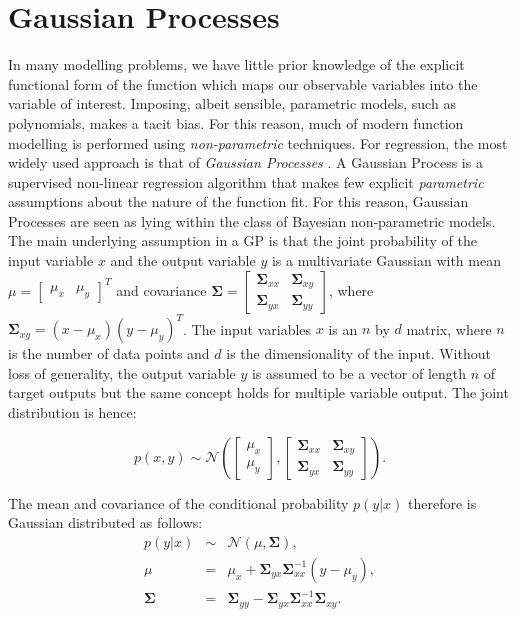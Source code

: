 \documentclass[useAMS,usenatbib,fleqn]{mn2e}
\begin{document}
\section{Gaussian Processes}
\label{sec-gaussian-process}
In many modelling problems, we have little prior knowledge of the explicit functional form of the function which maps our observable variables into the variable of interest. Imposing, albeit sensible, parametric models, such as polynomials, makes a tacit bias. For this reason, much of modern function modelling is performed using \emph{non-parametric} techniques. For regression, the most widely used approach is that of \emph{Gaussian Processes} \citep{rasmussen2006gaussian}.
A Gaussian Process is a supervised non-linear regression algorithm that makes few explicit \emph{parametric} assumptions about the nature of the function fit. For this reason, Gaussian Processes are seen as lying within the class of Bayesian non-parametric models. The main underlying assumption in a GP is that the joint probability of the input variable $x$ and the output variable $y$ is a multivariate Gaussian with mean $\mu=\begin{bmatrix} \mu_{x} & \mu_{y}\end{bmatrix}^{T}$ and covariance $\mathbf\Sigma=\begin{bmatrix}\mathbf\Sigma_{xx} & \mathbf\Sigma_{xy} \\ \mathbf\Sigma_{yx} & \mathbf\Sigma_{yy} \end{bmatrix}$, where $\mathbf\Sigma_{xy}=(x-\mu_{x})(y-\mu_{y})^{T}$. The input variables $x$ is an $n$ by $d$ matrix, where $n$ is the number of data points and $d$ is the dimensionality of the input. Without loss of generality, the output variable $y$ is assumed to be a vector of length $n$ of target outputs but the same concept holds for multiple variable output. The joint distribution is hence:

\begin{equation}
p\left ( x,y\right) \sim \mathcal{N} \left ( \begin{bmatrix}\mu_{x}\\\mu_{y} \end{bmatrix}, \begin{bmatrix}\mathbf\Sigma_{xx} & \mathbf\Sigma_{xy}\\\mathbf\Sigma_{yx} & \mathbf\Sigma_{yy} \end{bmatrix}\right ).
\end{equation}

The mean and covariance of the conditional probability $p(y|x)$ therefore is Gaussian distributed as follows:
\begin{equation}
\begin{array}{rcl}
p(y|x)		&	\sim		&	\mathcal{N} \left ( \mu, \mathbf\Sigma \right ),\\
\mu			&	=		&	\mu_{x}+\mathbf\Sigma_{yx}\mathbf\Sigma_{xx}^{-1}\left ( y-\mu_{y}\right ),\\
\mathbf\Sigma		&	=		&	\mathbf\Sigma_{yy}-\mathbf\Sigma_{yx}\mathbf\Sigma_{xx}^{-1}\mathbf\Sigma_{xy}.
\end{array}
\end{equation}
\end{document}
